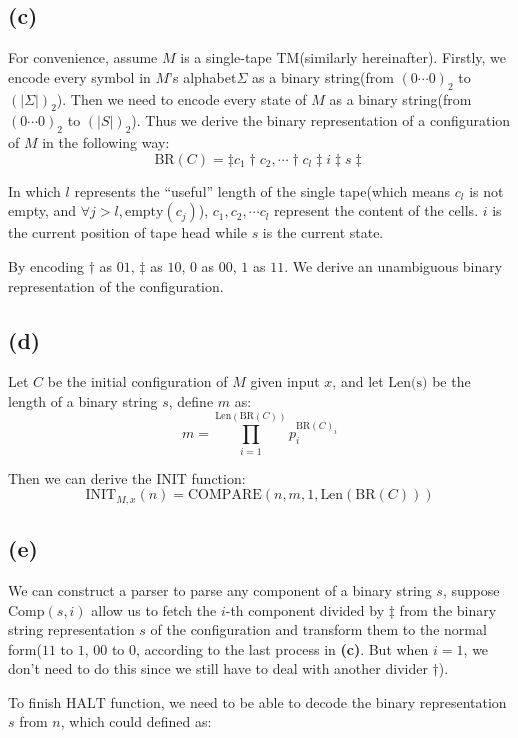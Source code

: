 \documentclass[paper=a4, fontsize=11pt]{scrartcl} %
\numberwithin{equation}{section} %
\numberwithin{figure}{section} %
\numberwithin{table}{section} %
\begin{document}
\subsection*{(c)}

For convenience, assume $M$ is a single-tape TM(similarly hereinafter). Firstly, we encode every symbol in $M$'s alphabet$\Sigma$ as a binary string(from $(0\cdots0)_2$ to $\left(\left|\Sigma\right|\right)_2$). Then we need to encode every state of $M$ as a binary string(from $(0\cdots0)_2$ to $\left(|S| \right)_2$). Thus we derive the binary representation of a configuration of $M$ in the following way:
$$\textrm{BR}(C) = \ddag c_1 \dag c_2, \cdots \dag c_l \ddag i \ddag s \ddag$$

In which $l$ represents the ``useful'' length of the single tape(which means $c_l$ is not empty, and $\forall j > l, \textrm{empty}(c_j)$), $c_1, c_2, \cdots c_l$ represent the content of the cells. $i$ is the current position of tape head while $s$ is the current state.

By encoding $\dag$ as $01$, $\ddag$ as $10$, $0$ as $00$, $1$ as $11$. We derive an unambiguous binary representation of the configuration.

\subsection*{(d)}

Let $C$ be the initial configuration of $M$ given input $x$, and let $\textrm{Len(s)}$ be the length of a binary string $s$, define $m$ as:
$$ m = \prod_{i = 1}^{\textrm{Len}(\textrm{BR}(C))}p_i^{\textrm{BR}(C)_i} $$

Then we can derive the INIT function:
$$\textrm{INIT}_{M, x}(n) = \textrm{COMPARE}(n, m, 1, \textrm{Len}(\textrm{BR}(C))) $$

\subsection*{(e)}
We can construct a parser to parse any component of a binary string $s$, suppose $\textrm{Comp}(s, i)$ allow us to fetch the $i$-th component divided by $\ddag$ from the binary string representation $s$ of the configuration and transform them to the normal form($11$ to $1$, $00$ to $0$, according to the last process in \textbf{(c)}. But when $i = 1$, we don't need to do this since we still have to deal with another divider $\dag$).

To finish $\textrm{HALT}$ function, we need to be able to decode the binary representation $s$ from $n$, which could defined as:
\end{document}
